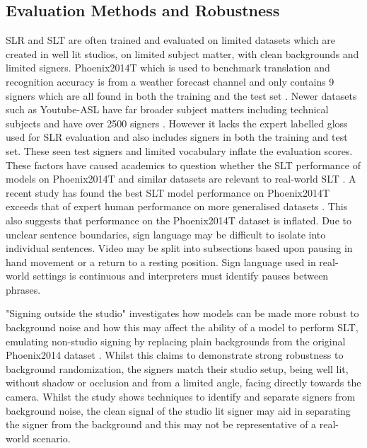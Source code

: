 \documentclass{article}
\begin{document}
\subsection{Evaluation Methods and Robustness}
SLR and SLT are often trained and evaluated on limited datasets which are created in well lit studios, on limited subject matter, with clean backgrounds and limited signers. Phoenix2014T which is used to benchmark translation and recognition accuracy is from a weather forecast channel and only contains 9 signers which are all found in both the training and the test set \cite{camgoz_neural_2018}. Newer datasets such as Youtube-ASL have far broader subject matters including technical subjects and have over 2500 signers \cite{uthus_youtube-asl_2023}. However it lacks the expert labelled gloss used for SLR evaluation and also includes signers in both the training and test set. These seen test signers and limited vocabulary inflate the evaluation scores. These factors have caused academics to question whether the SLT performance of models on Phoenix2014T and similar datasets are relevant to real-world SLT \cite{tanzer_reconsidering_2024} \cite{muller_considerations_2022} \cite{yazdani_critical_2025}. A recent study has found the best SLT model performance on Phoenix2014T exceeds that of expert human performance on more generalised datasets \cite{tanzer_reconsidering_2024}. This also suggests that performance on the Phoenix2014T dataset is inflated. Due to unclear sentence boundaries, sign language may be difficult to isolate into individual sentences. Video may be split into subsections based upon pausing in hand movement or a return to a resting position. Sign language used in real-world settings is continuous and interpreters must identify pauses between phrases. 


"Signing outside the studio" investigates how models can be made more robust to background noise and how this may affect the ability of a model to perform SLT, emulating non-studio signing by replacing plain backgrounds from the original Phoenix2014 dataset \cite{jang_signing_2022}. Whilst this claims to demonstrate strong robustness to background randomization, the signers match their studio setup, being well lit, without shadow or occlusion and from a limited angle, facing directly towards the camera. Whilst the study shows techniques to identify and separate signers from background noise, the clean signal of the studio lit signer may aid in separating the signer from the background and this may not be representative of a real-world scenario.
\end{document}
